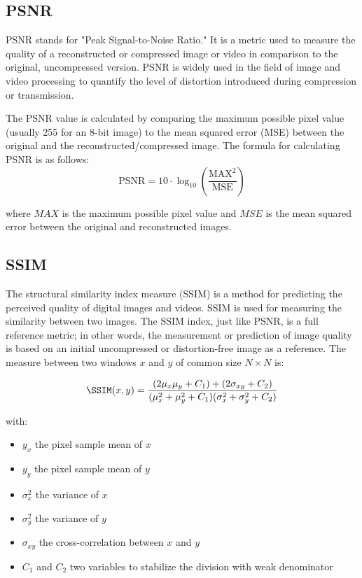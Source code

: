 \subsection{PSNR}
\label{subsec:psnr}
  PSNR\cite{psnr} stands for "Peak Signal-to-Noise Ratio." It is a metric used to measure the quality of a reconstructed or compressed image or video in comparison to the original, uncompressed version. PSNR is widely used in the field of image and video processing to quantify the level of distortion introduced during compression or transmission.

  The PSNR value is calculated by comparing the maximum possible pixel value (usually 255 for an 8-bit image) to the mean squared error (MSE) between the original and the reconstructed/compressed image. The formula for calculating PSNR is as follows:
  \[
  \text{PSNR} = 10 \cdot \log_{10}\left(\frac{\text{MAX}^2}{\text{MSE}}\right)
  \]

  where \(MAX\) is the maximum possible pixel value and \(MSE\) is the mean squared error between the original and reconstructed images.

\subsection{SSIM}
\label{subsec:ssim}
  The structural similarity index measure (SSIM\cite{ssim}) is a method for predicting the perceived quality of digital images and videos. SSIM is used for measuring the similarity between two images. The SSIM index, just like PSNR, is a full reference metric; in other words, the measurement or prediction of image quality is based on an initial uncompressed or distortion-free image as a reference. The measure between two windows \(x\) and \(y\) of common size \(N \times N\) is:


  \begin{equation}
    \SSIM(x,y) = \frac{(2\mu_x\mu_y + C_1) + (2 \sigma _{xy} + C_2)}
      {(\mu_x^2 + \mu_y^2+C_1) (\sigma_x^2 + \sigma_y^2+C_2)}
    \label{eq:SSMI}
  \end{equation}

  with:
  \begin{itemize}
    \itemsep0em
    \item \(y_x\) the pixel sample mean of \(x\)
    \item \(y_y\) the pixel sample mean of \(y\)
    \item \(\sigma_x^2\) the variance of \(x\)
    \item \(\sigma_y^2\) the variance of \(y\)
    \item \(\sigma _{xy}\) the cross-correlation between \(x\) and \(y\)
    \item \(C_1\) and \(C_2\) two variables to stabilize the division with weak denominator
  \end{itemize}


